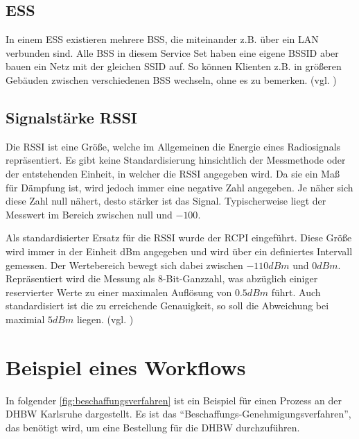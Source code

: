 \subsection{\gls{ESS}}

In einem \gls{ESS} existieren mehrere \gls{BSS}, die miteinander z.B. über ein \gls{LAN} verbunden sind.
Alle \gls{BSS} in diesem Service Set haben eine eigene \gls{BSSID} aber bauen ein Netz mit der gleichen \gls{SSID} auf.
So können Klienten z.B. in größeren Gebäuden zwischen verschiedenen \gls{BSS} wechseln, ohne es zu bemerken.
(vgl. \cite{Haider2019})

\subsection{Signalstärke \gls{RSSI}}

Die \gls{RSSI} ist eine Größe, welche im Allgemeinen die Energie eines Radiosignals repräsentiert.
Es gibt keine Standardisierung hinsichtlich der Messmethode oder der entstehenden Einheit, in
welcher die \gls{RSSI} angegeben wird. Da sie ein Maß für Dämpfung ist, wird jedoch immer eine
negative Zahl angegeben. Je näher sich diese Zahl null nähert, desto stärker ist das Signal.
Typischerweise liegt der Messwert im Bereich zwischen null und $-100$.

Als standardisierter Ersatz für die \gls{RSSI} wurde der \gls{RCPI} eingeführt. Diese Größe wird
immer in der Einheit dBm angegeben und wird über ein definiertes Intervall gemessen. Der
Wertebereich bewegt sich dabei zwischen $-110 dBm$ und $0 dBm$. Repräsentiert wird die Messung als
8-Bit-Ganzzahl, was abzüglich einiger reservierter Werte zu einer maximalen Auflösung von $0.5 dBm$
führt. Auch standardisiert ist die zu erreichende Genauigkeit, so soll die Abweichung bei maximial
$5 dBm$ liegen. (vgl. \cite{IEEE802.11-2012})

\section{Beispiel eines Workflows}

In folgender \autoref{fig:beschaffungsverfahren} ist ein Beispiel für einen Prozess an der \gls{DHBW} Karlsruhe dargestellt.
Es ist das \enquote{Beschaffungs-Genehmigungsverfahren}, das benötigt wird, um eine Bestellung für die \gls{DHBW} durchzuführen.

